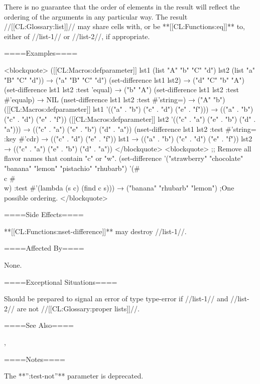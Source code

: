 There is no guarantee that the order of elements in the result will reflect the ordering of the arguments in any particular way. The result //[[CL:Glossary:list]]// may share cells with, or be **[[CL:Functions:eq]]** to, either of //list-1// or //list-2//, if appropriate.

====Examples====

<blockquote> ([[CL:Macros:defparameter]] lst1 (list "A" "b" "C" "d") lst2 (list "a" "B" "C" "d")) → ("a" "B" "C" "d") (set-difference lst1 lst2) → ("d" "C" "b" "A") (set-difference lst1 lst2 :test 'equal) → ("b" "A") (set-difference lst1 lst2 :test #'equalp) → NIL (nset-difference lst1 lst2 :test #'string=) → ("A" "b") ([[CL:Macros:defparameter]] lst1 '(("a" . "b") ("c" . "d") ("e" . "f"))) → (("a" . "b") ("c" . "d") ("e" . "f")) ([[CL:Macros:defparameter]] lst2 '(("c" . "a") ("e" . "b") ("d" . "a"))) → (("c" . "a") ("e" . "b") ("d" . "a")) (nset-difference lst1 lst2 :test #'string= :key #'cdr) → (("c" . "d") ("e" . "f")) lst1 → (("a" . "b") ("c" . "d") ("e" . "f")) lst2 → (("c" . "a") ("e" . "b") ("d" . "a")) </blockquote> <blockquote> ;; Remove all flavor names that contain "c" or "w". (set-difference '("strawberry" "chocolate" "banana" "lemon" "pistachio" "rhubarb") '(#\\c #\\w) :test #'(lambda (s c) (find c s))) → ("banana" "rhubarb" "lemon") ;One possible ordering. </blockquote>

====Side Effects====

**[[CL:Functions:nset-difference]]** may destroy //list-1//.

====Affected By====

None.

====Exceptional Situations====

Should be prepared to signal an error of type type-error if //list-1// and //list-2// are not //[[CL:Glossary:proper lists]]//.

====See Also====

{\secref\ConstantModification},

{\secref\TraversalRules}

====Notes====

The **'':test-not''** parameter is deprecated.

  
